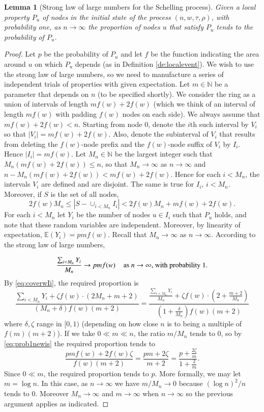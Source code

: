 \documentclass[11pt]{article}
\theoremstyle{plain}
\newtheorem{lem}[thm]{Lemma}
\numberwithin{equation}{subsection}
\newcommand{\Nat}{\mathbb{N}}
\begin{document}
\begin{lem}[Strong law of large numbers for the Schelling process]\label{le:sllnschel}
Given a local property $P_u$ of nodes in the initial state of 
the process $(n,w,\tau,\rho)$, with probability one, as $n\to\infty$
the proportion of nodes $u$ that satisfy $P_u$ tends to the probability of $P_u$.
\end{lem}
\begin{proof}
Let $p$ be the probability of $P_u$ and let $f$ be the function
indicating the area around $u$ on which $P_u$ depends (as in
Definition \ref{de:localevent}).
We wish to use the strong law of large numbers, so we need to
manufacture a series of independent trials of properties with given
expectation.
Let $m\in\Nat$ be a parameter that depends on $n$ 
(to be specified shortly).
 We consider the ring
as a union of intervals of length $mf(w)+2f(w)$ 
(which we think of an interval of length $mf(w)$ with padding $f(w)$ 
nodes on each side).
We always assume that $mf(w)+2f(w)<n$. Starting from node $0$, 
denote the $i$th such interval by $V_i$ so that $|V_i|=mf(w)+2f(w)$.
Also, denote the subinterval of $V_i$ 
that results from deleting the 
$f(w)$-node prefix and the $f(w)$-node suffix of $V_i$ by $I_i$.
Hence $|I_i|=mf(w)$.
Let $M_n\in\Nat$ be the largest integer 
such that $M_n(mf(w)+2f(w))\leq n$, so that $M_n\to\infty$ as $n\to\infty$ and
$n-M_n(mf(w)+2f(w))<mf(w)+2f(w)$. 
Hence for each $i<M_n$, the intervals 
$V_i$ are defined and are disjoint. 
The same is true for $I_i$, $i<M_n$.
Moreover, if $S$ is the set of all nodes,
\begin{equation}\label{eq:coverwIi}
2f(w)M_n \leq |S-\cup_{i<M_n} I_i| < 2f(w)M_n+mf(w)+2f(w).
\end{equation}
For each $i<M_n$ let $Y_i$ be the number of 
nodes 
$u\in I_i$ such that $P_u$ holds, and note that these
random variables are independent.
Moreover, by linearity of expectation, 
$\mathbb{E}(Y_i)=pmf(w)$.
Recall that $M_n\to\infty$ as $n\to \infty$.
According to the strong law of large numbers, 

\begin{equation}\label{eq:prob1newis}
\frac{\sum_{i<M_n} Y_i}{M_n}\to 
pmf(w) \hspace{0.4cm}
\textrm{as $n\to\infty$, with probability 1.}
\end{equation}
By \eqref{eq:coverwIi}, the required proportion is
\[
\frac{\sum_{i<M_n} Y_i +\zeta f(w)\cdot (2M_n+m+2)}{(M_n +\delta) f(w)(m+2)}=
\frac{\frac{\sum_{i<M_n} Y_i}{M_n} +
\zeta f(w)\cdot (2+\frac{m+2}{M_n})}{(1 +\frac{\delta}{M_n}) f(w)(m+2)}
\]
where $\delta,\zeta$ range in $[0,1)$ (depending on how close
$n$ is to being a multiple of $f(m)(m+2)$).
If we take $0\ll m\ll n$, the ratio $m/M_n$ tends to $0$, so
by \eqref{eq:prob1newis} the
required proportion tends to
\[
\frac{pm f(w)+2f(w)\zeta}{f(w)(m+2)}=
\frac{pm +2\zeta}{m+2}=
\frac{p +\frac{2\zeta}{m}}{1+\frac{2}{m}}.
\]
Since $0\ll m$, the required proportion tends to $p$.
More formally, we may let $m=\log n$. In this case, as $n\to\infty$
we have $m/M_n\to 0$ because $(\log n)^2/n$ tends to $0$.
Moreover $M_n\to\infty$ and $m\to\infty$ when $n\to\infty$ so
the previous argument applies as indicated.
\end{proof}
\end{document}
